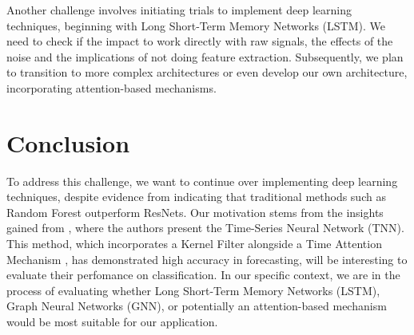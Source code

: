 \documentclass{article}
\begin{document}
Another challenge involves initiating trials to implement deep learning techniques, beginning with Long Short-Term Memory Networks (LSTM). We need to check if the impact to work directly with raw signals, the effects of the noise and the implications of not doing feature extraction. Subsequently, we plan to transition to more complex architectures or even develop our own architecture, incorporating attention-based mechanisms.

\section{Conclusion}

To address this challenge, we want to continue over implementing deep learning techniques, despite evidence from \cite{Sundararajan2021} indicating that traditional methods such as Random Forest outperform ResNets. Our motivation stems from the insights gained from \cite{Zhang2023}, where the authors present the Time-Series Neural Network (TNN). This method, which incorporates a Kernel Filter alongside a Time Attention Mechanism \cite{Zhang2023}, has demonstrated high accuracy in forecasting, will be interesting to evaluate their perfomance on classification. In our specific context, we are in the process of evaluating whether Long Short-Term Memory Networks (LSTM), Graph Neural Networks (GNN), or potentially an attention-based mechanism would be most suitable for our application.


{
\small
}
\end{document}
